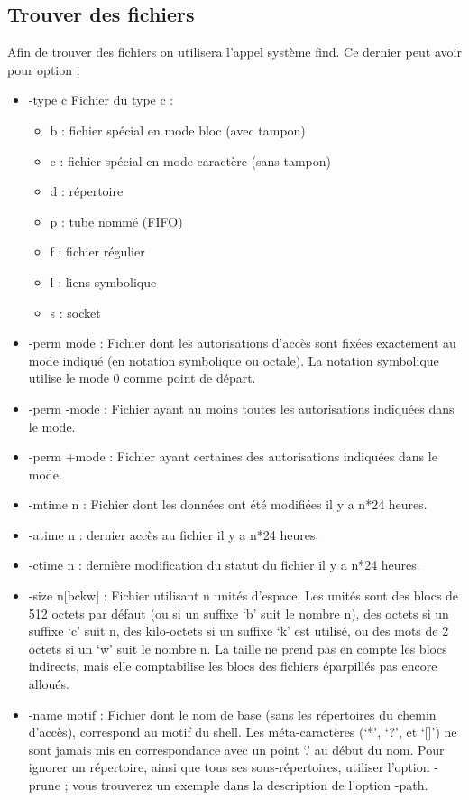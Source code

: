 \documentclass{article}[12pt]
\begin{document}
\subsection{Trouver des fichiers}
Afin de trouver des fichiers on utilisera l'appel système find. Ce dernier peut avoir pour option :
\begin{itemize}
\item  -type c Fichier du type c :
\begin{itemize}
\item b : fichier spécial en mode bloc (avec tampon)
\item c : fichier spécial en mode caractère (sans tampon)
\item d : répertoire
\item p : tube nommé (FIFO)
\item f : fichier régulier
\item l : liens symbolique
\item s : socket
\end{itemize}
\item -perm mode : Fichier dont les autorisations d'accès sont fixées exactement au mode indiqué (en notation symbolique ou octale). La notation symbolique utilise le mode 0 comme point de départ.
\item -perm -mode : Fichier ayant au moins toutes les autorisations indiquées dans le mode.
\item -perm +mode : Fichier ayant certaines des autorisations indiquées dans le mode.
\item -mtime n : Fichier dont les données ont été modifiées il y a n*24 heures.
\item -atime n : dernier accès au fichier il y a n*24 heures.
\item -ctime n : dernière modification du statut du fichier il y a n*24 heures.
\item -size n[bckw] : Fichier utilisant n unités d'espace. Les unités sont des blocs de 512 octets par défaut (ou si un suffixe `b' suit le nombre n), des octets si un suffixe `c' suit n, des kilo-octets si un suffixe `k' est utilisé, ou des mots de 2 octets si un `w' suit le nombre n. La taille ne prend pas en compte les blocs indirects, mais elle comptabilise les blocs des fichiers éparpillés pas encore alloués.
\item -name motif : Fichier dont le nom de base (sans les répertoires du chemin d'accès), correspond au motif du shell. Les méta-caractères (`*', `?', et `[]') ne sont jamais mis en correspondance avec un point `.' au début du nom. Pour ignorer un répertoire, ainsi que tous ses sous-répertoires, utiliser l'option -prune ; vous trouverez un exemple dans la description de l'option -path.

\end{itemize}
\end{document}

